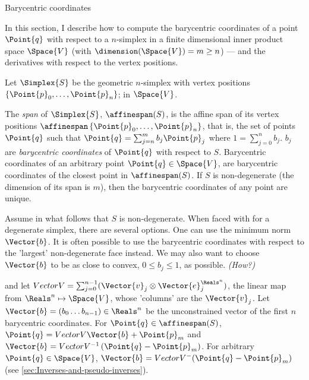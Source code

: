 \begin{plSection}{Barycentric coordinates}
\label{sec:barycentric-coordinates}

In this section, I describe how to compute
the barycentric coordinates of a point $\Point{q}$
with respect to a $n$-simplex in
a finite dimensional inner product space $\Space{V}$
(with $\dimension (\Space{V} ) = m \ge n$) ---
and the derivatives with respect to the vertex positions.

Let $\Simplex{S}$ be the geometric $n$-simplex
with vertex positions $\left\{\Point{p}_0 , \ldots , \Point{p}_n\right\}$;
in $\Space{V}$.

The {\it span} of $\Simplex{S}$, $\affinespan ( S )$,
is the affine span of its vertex positions
$\affinespan \left\{\Point{p}_0 , \ldots , \Point{p}_n\right\}$,
that is, the set of points $\Point{q}$ such that
$\Point{q} = \sum_{j=n}^{m} b_j \Point{p}_j $ 
where $1 = \sum_{j=0}^{n} b_j $.
$b_j$ are {\it barycentric coordinates} of $\Point{q}$ 
with respect to $S$.
Barycentric coordinates of an arbitrary point 
$\Point{q} \in \Space{V}$,
are barycentric coordinates of the closest point in $\affinespan(S)$.
If $S$ is non-degenerate (the dimension of its span is $m$),
then the barycentric coordinates of any point are unique.

Assume in what follows that $S$ is non-degenerate.
When faced with for a degenerate simplex, there are several options.
One can use the minimum norm $\Vector{b}$.
It is often possible to use the barycentric coordinates
with respect to the 'largest' non-degenerate face instead.
We may also want to choose $\Vector{b}$ to be as close to convex,
$0 \le b_j \le 1$, as possible. {\it (How?)}

and let $Vector{V} =
 \sum_{j=0}^{n-1} ( \Vector{v}_j \otimes \Vector{e}_j^{\Reals^n} )$,
the linear map from $\Reals^n \mapsto \Space{V}$,
whose 'columns' are the $\Vector{v}_j$.
Let $\Vector{b} = \left( b_0 \ldots b_{n-1} \right) \in \Reals^n$
be the unconstrained vector of the first $n$ barycentric coordinates.
For $\Point{q} \in \affinespan ( S )$, 
$\Point{q} = Vector{V} \Vector{b} + \Point{p}_m$
and $\Vector{b} = 
Vector{V}^{-1} \left ( \Point{q} - \Point{p}_m \right)$.
For arbitrary $\Point{q} \in \Space{V}$,
$\Vector{b} = Vector{V}^{-} (\Point{q} - \Point{p}_m)$
(see \cref{sec:Inverses-and-pseudo-inverses}).

\end{plSection}%
